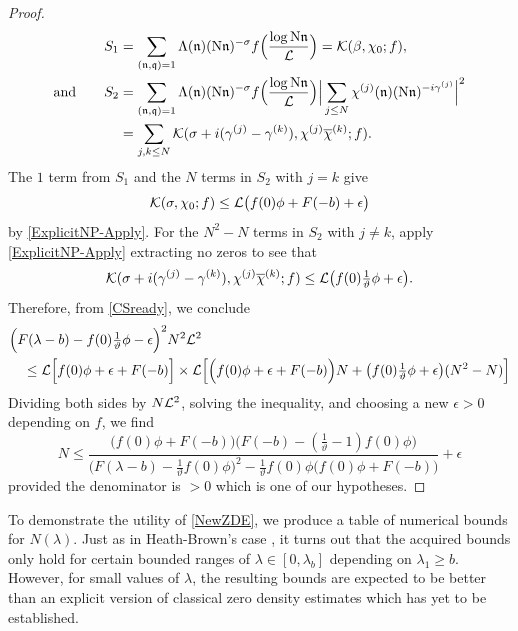 \documentclass[12pt,psamsfonts]{amsart}
\theoremstyle{definition}
\theoremstyle{remark}
\numberwithin{equation}{section}
\begin{document}
\begin{proof}
\begin{align*}
S_1 & = \sum_{(\mathfrak{n},\mathfrak{q})=1} \Lambda(\mathfrak{n}) (\mathrm{N}\mathfrak{n})^{-\sigma} f\Big( \frac{\log \mathrm{N}\mathfrak{n}}{\mathcal{L}}\Big) = \mathcal{K}(\beta, \chi_0; f), \\
\text{and} \qquad S_2 & = \sum_{(\mathfrak{n},\mathfrak{q}) =1} \Lambda(\mathfrak{n}) (\mathrm{N}\mathfrak{n})^{-\sigma} f\Big( \frac{\log \mathrm{N}\mathfrak{n}}{\mathcal{L}}\Big) \Big| \sum_{j \leq N} \chi^{(j)}(\mathfrak{n}) (\mathrm{N}\mathfrak{n})^{-i\gamma^{(j)}} \Big|^2   \\
& = \sum_{j,k \leq N} \mathcal{K}(\sigma+i(\gamma^{(j)}-\gamma^{(k)}), \chi^{(j)}\overline{\chi}^{(k)}; f). 
\end{align*}
The  $1$ term from $S_1$ and the $N$ terms in $S_2$ with $j=k$ give
\[
\mathcal{K}(\sigma,\chi_0; f) \leq \mathcal{L} \big( f(0) \phi  + F(-b )  + \epsilon \big)
\]
by \cref{ExplicitNP-Apply}. For the $N^2-N$ terms in $S_2$ with $j \neq k$, apply \cref{ExplicitNP-Apply} extracting no zeros to see that
\[
\mathcal{K}(\sigma+i(\gamma^{(j)}-\gamma^{(k)}), \chi^{(j)}\overline{\chi}^{(k)}; f) \leq \mathcal{L} \big( f(0) \tfrac{1}{\vartheta} \phi + \epsilon \big).
\]
 Therefore, from \eqref{CSready}, we conclude
\begin{align*}
&  \Big( F(\lambda-b) - f(0)\tfrac{1}{\vartheta}\phi - \epsilon \Big)^2 N^2 \mathcal{L}^2  \\
& \quad \leq   \mathcal{L} \Big[ f(0) \phi + \epsilon  + F(-b )  \Big]  \times \mathcal{L} \Big[ \Big( f(0) \phi + \epsilon + F(-b )  \Big) N + \big(f(0) \tfrac{1}{\vartheta}\phi + \epsilon \big) (N^2-N) \Big] 
\end{align*}
Dividing both sides by $N \mathcal{L}^2$, solving the inequality, and choosing a new $\epsilon > 0$ depending on $f$, we find
\[
N \leq 
\frac{\Big( f(0)\phi + F(-b) \Big)\Big( F(-b) - (\tfrac{1}{\vartheta}-1)f(0)\phi \Big)}
{\Big( F(\lambda-b) - \tfrac{1}{\vartheta}f(0)\phi \Big)^2 -\tfrac{1}{\vartheta} f(0)\phi \Big(f(0)\phi + F(-b) \Big)} + \epsilon
\]
provided the denominator is $> 0$ which is one of our hypotheses.
\end{proof}

To demonstrate the utility of \cref{NewZDE}, we produce a table of numerical bounds for $N(\lambda)$. Just as in Heath-Brown's case \cite[Table 13]{HBLinnik}, it turns out that the acquired bounds only hold for certain bounded ranges of $\lambda \in [0, \lambda_b]$ depending on $\lambda_1 \geq b$. However, for small values of $\lambda$, the resulting bounds are expected to be better than an explicit version of classical zero density estimates which has yet to be established.  
\end{document}
